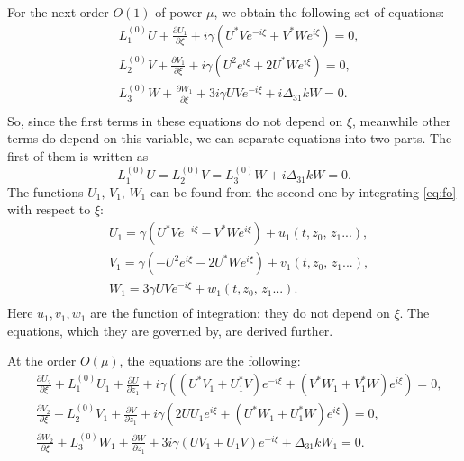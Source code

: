 \documentclass[a4paper, 12pt, onecolumn]{extarticle}
\begin{document}
For the next order \(O(1)\) of power \(\mu\), we obtain the following set of equations:
\begin{equation}
\label{eq:fo}
\begin{aligned}
&L_1^{(0)}U+\frac{\partial U_1}{\partial\xi}+i\gamma(U^*Ve^{-i\xi}+V^*We^{i\xi})=0,\\
&L_2^{(0)}V+\frac{\partial V_1}{\partial \xi}+i\gamma(U^2e^{i\xi}+2U^*We^{i\xi})=0,\\
&L_3^{(0)}W+\frac{\partial W_1}{\partial \xi}+3i\gamma UVe^{-i\xi}+i\Delta_{31}kW=0.\\
\end{aligned}
\end{equation}
So, since the first terms in these equations do not depend on \(\xi\), meanwhile other terms do depend on this variable, we can separate equations into two parts. The first of them is written as
\begin{equation}
\label{eq:m1}
L_1^{(0)}U=L_2^{(0)}V=L_3^{(0)}W+i\Delta_{31}kW=0.
\end{equation}
The functions \(U_1,\,V_1,\,W_1\) can be found from the second one by integrating \eqref{eq:fo} with respect to \(\xi\):
\begin{equation}
\label{eq:ford}
\begin{aligned}
&U_1=\gamma(U^*Ve^{-i\xi}-V^*We^{i\xi})+u_1(t,z_0,\,z_1...),\\
&V_1=\gamma(-U^2e^{i\xi}-2U^*We^{i\xi})+v_1(t,z_0,\,z_1...),\\
&W_1=3\gamma UVe^{-i\xi}+w_1(t,z_0,\,z_1...).\\
\end{aligned}
\end{equation}
Here \(u_1, v_1, w_1\) are the function of integration: they do not depend on \(\xi\). The equations, which they are governed by, are derived further.

At the order \(O(\mu)\), the equations are the following:
\[\begin{aligned}
&\frac{\partial U_2}{\partial \xi}+L_1^{(0)}U_1+\frac{\partial U}{\partial z_1}+i\gamma((U^*V_1+U_1^*V)e^{-i\xi}+(V^*W_1+V_1^*W)e^{i\xi})=0,\\
&\frac{\partial V_2}{\partial \xi}+L_2^{(0)}V_1+\frac{\partial V}{\partial z_1}+i\gamma(2UU_1e^{i\xi}+(U^*W_1+U_1^*W)e^{i\xi})=0,\\
&\frac{\partial W_2}{\partial \xi}+L_3^{(0)}W_1+\frac{\partial W}{\partial z_1}+3i\gamma(UV_1+U_1V)e^{-i\xi}+\Delta_{31}kW_1=0.\\
\end{aligned}\]
\end{document}
